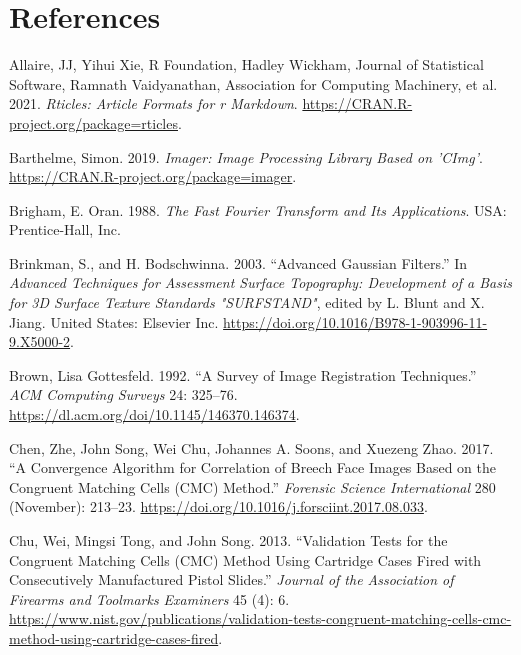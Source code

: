 \hypertarget{references}{%
\section*{References}\label{references}}

\hypertarget{refs}{}
\begin{CSLReferences}{1}{0}
\leavevmode{}%
Allaire, JJ, Yihui Xie, R Foundation, Hadley Wickham, Journal of Statistical Software, Ramnath Vaidyanathan, Association for Computing Machinery, et al. 2021. \emph{Rticles: Article Formats for r Markdown}. \url{https://CRAN.R-project.org/package=rticles}.

\leavevmode{}%
Barthelme, Simon. 2019. \emph{Imager: Image Processing Library Based on 'CImg'}. \url{https://CRAN.R-project.org/package=imager}.

\leavevmode{}%
Brigham, E. Oran. 1988. \emph{The Fast Fourier Transform and Its Applications}. USA: Prentice-Hall, Inc.

\leavevmode{}%
Brinkman, S., and H. Bodschwinna. 2003. {``Advanced {Gaussian} Filters.''} In \emph{Advanced Techniques for Assessment Surface Topography: Development of a Basis for 3D Surface Texture Standards {"}SURFSTAND{"}}, edited by L. Blunt and X. Jiang. United States: Elsevier Inc. \url{https://doi.org/10.1016/B978-1-903996-11-9.X5000-2}.

\leavevmode{}%
Brown, Lisa Gottesfeld. 1992. {``{A Survey of Image Registration Techniques}.''} \emph{ACM Computing Surveys} 24: 325--76. \url{https://dl.acm.org/doi/10.1145/146370.146374}.

\leavevmode{}%
Chen, Zhe, John Song, Wei Chu, Johannes A. Soons, and Xuezeng Zhao. 2017. {``A Convergence Algorithm for Correlation of Breech Face Images Based on the Congruent Matching Cells ({CMC}) Method.''} \emph{Forensic Science International} 280 (November): 213--23. \url{https://doi.org/10.1016/j.forsciint.2017.08.033}.

\leavevmode{}%
Chu, Wei, Mingsi Tong, and John Song. 2013. {``Validation {Tests} for the {Congruent} {Matching} {Cells} ({CMC}) {Method} {Using} {Cartridge} {Cases} {Fired} with {Consecutively} {Manufactured} {Pistol} {Slides}.''} \emph{Journal of the Association of Firearms and Toolmarks Examiners} 45 (4): 6. \url{https://www.nist.gov/publications/validation-tests-congruent-matching-cells-cmc-method-using-cartridge-cases-fired}.


\end{CSLReferences}
